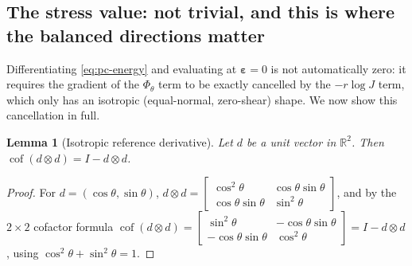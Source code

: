 \documentclass[10pt,a4paper]{article}
\newtheorem{lemma}{Lemma}
\newcommand{\Cof}{\operatorname{cof}}
\newcommand{\R}{\mathbb{R}}
\begin{document}
\subsection{The stress value: not trivial, and this is where the balanced directions matter}
Differentiating \eqref{eq:pc-energy} and evaluating at $\bm\varepsilon=0$
is not automatically zero: it requires the gradient of the $\Phi_\theta$
term to be exactly cancelled by the $-r\log J$ term, which only has an
isotropic (equal-normal, zero-shear) shape.  We now show this cancellation
in full.

\begin{lemma}[Isotropic reference derivative]
\label{lem:isotropic}
Let $d$ be a unit vector in $\R^2$.  Then $\Cof(d\otimes d)=I-d\otimes d$.
\end{lemma}
\begin{proof}
For $d=(\cos\theta,\sin\theta)$, $d\otimes d=
\left[\begin{smallmatrix}\cos^2\theta&\cos\theta\sin\theta\\
\cos\theta\sin\theta&\sin^2\theta\end{smallmatrix}\right]$, and by the
$2\times2$ cofactor formula
$\Cof(d\otimes d)=\left[\begin{smallmatrix}\sin^2\theta&-\cos\theta\sin\theta\\
-\cos\theta\sin\theta&\cos^2\theta\end{smallmatrix}\right]
=I-d\otimes d$, using $\cos^2\theta+\sin^2\theta=1$.
\end{proof}
\end{document}
